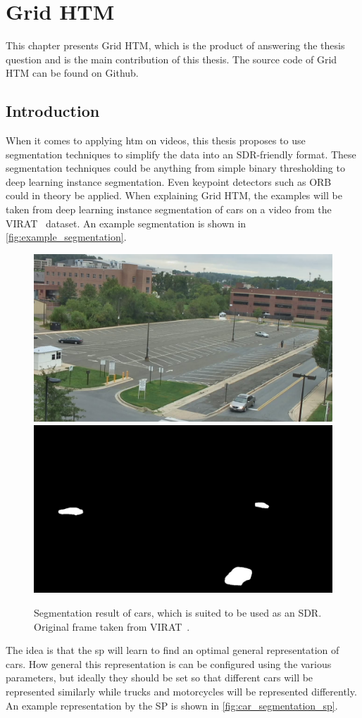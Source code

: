 \chapter{Grid HTM}
\label{sec:grid_htm}
This chapter presents Grid HTM, which is the product of answering the thesis question and is the main contribution of this thesis. The source code of Grid HTM can be found on Github\cite{master_thesis_github}.
\section{Introduction}
\par
When it comes to applying \gls*{htm} on videos, this thesis proposes to use segmentation techniques to simplify the data into an SDR-friendly format. These segmentation techniques could be anything from simple binary thresholding to deep learning instance segmentation. Even keypoint detectors such as ORB~\cite{orb_detector} could in theory be applied. When explaining Grid HTM, the examples will be taken from deep learning instance segmentation of cars on a video from the VIRAT~\cite{VIRAT} dataset. An example segmentation is shown in \autoref{fig:example_segmentation}.
\begin{figure}[H]
    \centering
    \includegraphics[width=.45\textwidth]{resources/methodology/original.png}
    \includegraphics[width=.45\textwidth]{resources/methodology/car_segmentation.png}
    \caption[Segmentation Result of Cars]{Segmentation result of cars, which is suited to be used as an SDR. Original frame taken from VIRAT~\cite{VIRAT}.}
    \label{fig:example_segmentation}
\end{figure}
The idea is that the \gls*{sp} will learn to find an optimal general representation of cars. How general this representation is can be configured using the various parameters, but ideally they should be set so that different cars will be represented similarly while trucks and motorcycles will be represented differently. An example representation by the SP is shown in \autoref{fig:car_segmentation_sp}.
